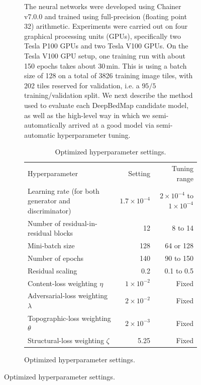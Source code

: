 \documentclass[tc, noline]{copernicus}
\begin{document}
\begin{figure}[t]
\begin{figure}[t]
The neural networks were developed using Chainer v7.0.0 \citep{TokuiChainerDeepLearning2019} and trained using full-precision (floating point 32) arithmetic.
Experiments were carried out on four graphical processing units (GPUs), specifically two Tesla P100 GPUs and two Tesla V100 GPUs.
On the Tesla V100 GPU setup, one training run with about 150 epochs takes about 30\,min.
This is using a batch size of 128 on a total of 3826 training image tiles, with 202 tiles reserved for validation, i.e. a $95/5$ training/validation split.
We next describe the method used to evaluate each DeepBedMap candidate model, as well as the high-level way in which we semi-automatically arrived at a good model via semi-automatic hyperparameter tuning.

\begin{table}[h!]
  \hack{\hsize\textwidth}
  \caption{Optimized hyperparameter settings.}
  \label{table:B1}
  \begin{tabular}{lrr}
  \tophline
  Hyperparameter                                       & Setting             & Tuning range                           \\
  \middlehline
  Learning rate (for both generator and discriminator) & $1.7\times 10^{-4}$ & $2\times 10^{-4}$ to $1\times 10^{-4}$ \\
  Number of residual-in-residual blocks                & 12                  & 8 to 14                                \\
  Mini-batch size                                      & 128                 & 64 or 128                              \\
  Number of epochs                                     & 140                 & 90 to 150                              \\
  Residual scaling                                     & 0.2                 & 0.1 to 0.5                             \\
  Content-loss weighting $\eta$                        & $1\times 10^{-2}$   & Fixed                                  \\
  Adversarial-loss weighting $\lambda$                 & $2\times 10^{-2}$   & Fixed                                  \\
  Topographic-loss weighting $\theta$                  & $2\times 10^{-3}$   & Fixed                                  \\
  Structural-loss weighting $\zeta$                    & 5.25                & Fixed                                  \\

\end{tabular}
\end{table}
\end{figure}
\end{figure}
\end{document}
